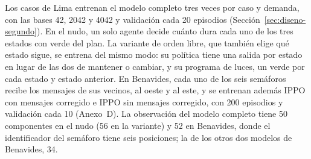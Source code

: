 Los casos de Lima entrenan el modelo completo tres veces por caso y
demanda, con las bases 42, 2042 y 4042 y validación cada 20 episodios
(Sección~\ref{sec:diseno-segundo}). En el nudo, un solo agente decide
cuánto dura cada uno de los tres estados con verde del plan. La
variante de orden libre, que también elige qué estado sigue, se entrena
del mismo modo: su política tiene una salida por estado en lugar de las
dos de mantener o cambiar, y su programa de luces, un verde por cada
estado y estado anterior. En Benavides, cada uno de los seis semáforos
recibe los mensajes de sus vecinos, al oeste y al este, y se entrenan
además IPPO con mensajes corregido e IPPO sin mensajes corregido, con
200 episodios y validación cada 10 (Anexo~D). La observación del modelo
completo tiene 50 componentes en el nudo (56 en la variante) y 52 en
Benavides, donde el identificador del semáforo tiene seis posiciones;
la de los otros dos modelos de Benavides, 34.

